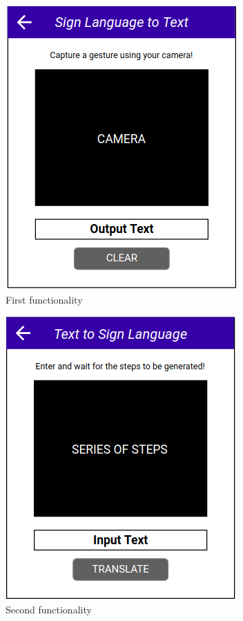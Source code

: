 \documentclass[journal]{./IEEE/IEEEtran}
\begin{document}
\begin{figure}[ht!]
    \centering
    \includegraphics[width=.95\linewidth]{./images/2.png}
    \caption{First functionality}
    \label{fig:label2}
\end{figure}

\begin{figure}[ht!]
    \centering
    \includegraphics[width=.95\linewidth]{./images/3.png}
    \caption{Second functionality}
    \label{fig:label3}
\end{figure}
\end{document}
